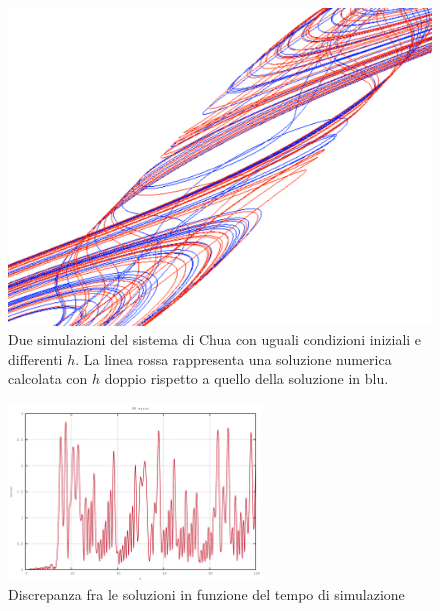 \begin{figure}[H]
\centering
\includegraphics[width=\textwidth]{rk_error}
\caption{Due simulazioni del sistema di Chua con uguali condizioni iniziali e differenti $h$. La linea rossa rappresenta una soluzione numerica calcolata con $h$ doppio rispetto a quello della soluzione in blu.}
\label{fig:rk_error}
\end{figure}

\begin{figure}[H]
\centering
\includegraphics[width=0.6\textwidth]{ode}
\caption{Discrepanza fra le soluzioni in funzione del tempo di simulazione}
\label{fig:ode}
\end{figure}

